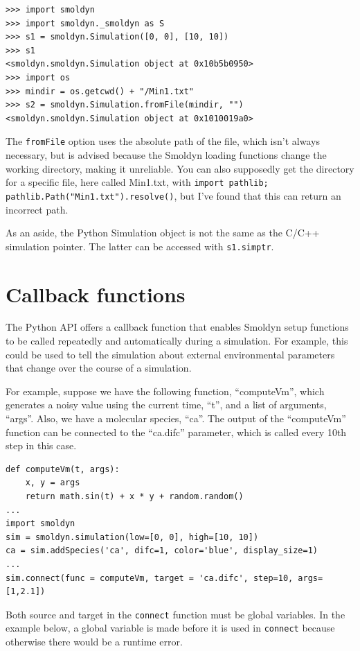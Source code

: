 \documentclass {scrbook}
\newcommand {\ttt} {\texttt}
\begin{document}
\begin{lstlisting}[style=SSAPython]
>>> import smoldyn
>>> import smoldyn._smoldyn as S
>>> s1 = smoldyn.Simulation([0, 0], [10, 10])
>>> s1
<smoldyn.smoldyn.Simulation object at 0x10b5b0950>
>>> import os
>>> mindir = os.getcwd() + "/Min1.txt"
>>> s2 = smoldyn.Simulation.fromFile(mindir, "")
<smoldyn.smoldyn.Simulation object at 0x1010019a0>
\end{lstlisting}

The \ttt{fromFile} option uses the absolute path of the file, which isn't always necessary, but is advised because the Smoldyn loading functions change the working directory, making it unreliable. You can also supposedly get the directory for a specific file, here called Min1.txt, with \ttt{import pathlib; pathlib.Path("Min1.txt").resolve()}, but I've found that this can return an incorrect path.

As an aside, the Python Simulation object is not the same as the C/C++ simulation pointer. The latter can be accessed with \ttt{s1.simptr}.

\section{Callback functions}

The Python API offers a callback function that enables Smoldyn setup functions to be called repeatedly and automatically during a simulation. For example, this could be used to tell the simulation about external environmental parameters that change over the course of a simulation.

For example, suppose we have the following function, ``computeVm'', which generates a noisy value using the current time, ``t'', and a list of arguments, ``args''. Also, we have a molecular species, ``ca''. The output of the ``computeVm'' function can be connected to the ``ca.difc'' parameter, which is called every 10th step in this case.

\begin{lstlisting}[style=SSAPython]
def computeVm(t, args):
    x, y = args
    return math.sin(t) + x * y + random.random()
...
import smoldyn
sim = smoldyn.simulation(low=[0, 0], high=[10, 10])
ca = sim.addSpecies('ca', difc=1, color='blue', display_size=1)
...
sim.connect(func = computeVm, target = 'ca.difc', step=10, args=[1,2.1])
\end{lstlisting}

Both source and target in the \ttt{connect} function must be global variables. In the example below, a global variable is made before it is used in \ttt{connect} because otherwise there would be a runtime error.
\end{document}
